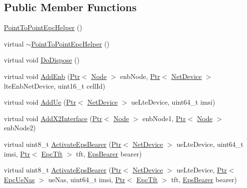 \subsection*{Public Member Functions}
\begin{DoxyCompactItemize}
\item 
\hyperlink{classns3_1_1PointToPointEpcHelper_a3d4c34f6a194c994d45e0dac5019b8cb}{Point\+To\+Point\+Epc\+Helper} ()
\item 
virtual \hyperlink{classns3_1_1PointToPointEpcHelper_a50e15771cdc76c479d7e481f5dfa3ce8}{$\sim$\+Point\+To\+Point\+Epc\+Helper} ()
\item 
virtual void \hyperlink{classns3_1_1PointToPointEpcHelper_ab5c23d36d6ebaf64ea8447c54f9863f4}{Do\+Dispose} ()
\item 
virtual void \hyperlink{classns3_1_1PointToPointEpcHelper_a6636cc9c0501b719bd81ed13efd3c589}{Add\+Enb} (\hyperlink{classns3_1_1Ptr}{Ptr}$<$ \hyperlink{classns3_1_1Node}{Node} $>$ enb\+Node, \hyperlink{classns3_1_1Ptr}{Ptr}$<$ \hyperlink{classns3_1_1NetDevice}{Net\+Device} $>$ lte\+Enb\+Net\+Device, uint16\+\_\+t cell\+Id)
\item 
virtual void \hyperlink{classns3_1_1PointToPointEpcHelper_a6ed801de21387477fabd23eeafff7e73}{Add\+Ue} (\hyperlink{classns3_1_1Ptr}{Ptr}$<$ \hyperlink{classns3_1_1NetDevice}{Net\+Device} $>$ ue\+Lte\+Device, uint64\+\_\+t imsi)
\item 
virtual void \hyperlink{classns3_1_1PointToPointEpcHelper_acfe584410f202b46acbcf194b7a79987}{Add\+X2\+Interface} (\hyperlink{classns3_1_1Ptr}{Ptr}$<$ \hyperlink{classns3_1_1Node}{Node} $>$ enb\+Node1, \hyperlink{classns3_1_1Ptr}{Ptr}$<$ \hyperlink{classns3_1_1Node}{Node} $>$ enb\+Node2)
\item 
virtual uint8\+\_\+t \hyperlink{classns3_1_1PointToPointEpcHelper_a97023077eae8644e8f1b269a357c8f93}{Activate\+Eps\+Bearer} (\hyperlink{classns3_1_1Ptr}{Ptr}$<$ \hyperlink{classns3_1_1NetDevice}{Net\+Device} $>$ ue\+Lte\+Device, uint64\+\_\+t imsi, \hyperlink{classns3_1_1Ptr}{Ptr}$<$ \hyperlink{classns3_1_1EpcTft}{Epc\+Tft} $>$ tft, \hyperlink{structns3_1_1EpsBearer}{Eps\+Bearer} bearer)
\item 
virtual uint8\+\_\+t \hyperlink{classns3_1_1PointToPointEpcHelper_a4162765d21783258e7a1d336b1fcf1f5}{Activate\+Eps\+Bearer} (\hyperlink{classns3_1_1Ptr}{Ptr}$<$ \hyperlink{classns3_1_1NetDevice}{Net\+Device} $>$ ue\+Lte\+Device, \hyperlink{classns3_1_1Ptr}{Ptr}$<$ \hyperlink{classns3_1_1EpcUeNas}{Epc\+Ue\+Nas} $>$ ue\+Nas, uint64\+\_\+t imsi, \hyperlink{classns3_1_1Ptr}{Ptr}$<$ \hyperlink{classns3_1_1EpcTft}{Epc\+Tft} $>$ tft, \hyperlink{structns3_1_1EpsBearer}{Eps\+Bearer} bearer)

\end{DoxyCompactItemize}
